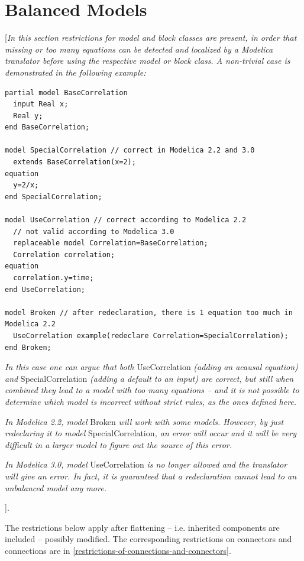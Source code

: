 \documentclass[10pt,a4paper]{report}
\def\doublelabel#1{\label{#1}}
\begin{document}
\section{Balanced Models}\doublelabel{balanced-models}

{[}\emph{In this section restrictions for model and block classes are
present, in order that missing or too many equations can be detected and
localized by a Modelica translator before using the respective model or
block class. A non-trivial case is demonstrated in the following
example:}

\begin{lstlisting}[language=modelica]
partial model BaseCorrelation
  input Real x;
  Real y;
end BaseCorrelation;

model SpecialCorrelation // correct in Modelica 2.2 and 3.0
  extends BaseCorrelation(x=2);
equation
  y=2/x;
end SpecialCorrelation;

model UseCorrelation // correct according to Modelica 2.2
  // not valid according to Modelica 3.0
  replaceable model Correlation=BaseCorrelation;
  Correlation correlation;
equation
  correlation.y=time;
end UseCorrelation;

model Broken // after redeclaration, there is 1 equation too much in Modelica 2.2
  UseCorrelation example(redeclare Correlation=SpecialCorrelation);
end Broken;
\end{lstlisting}

\emph{In this case one can argue that both} UseCorrelation \emph{(adding
an acausal equation) and} SpecialCorrelation \emph{(adding a default to
an input) are correct, but still when combined they lead to a model with
too many equations -- and it is not possible to determine which model is
incorrect without strict rules, as the ones defined here.}

\emph{In Modelica 2.2, model} Broken \emph{will work with some models.
However, by just redeclaring it to model} SpecialCorrelation\emph{, an
error will occur and it will be very difficult in a larger model to
figure out the source of this error. }

\emph{In Modelica 3.0, model} UseCorrelation \emph{is no longer allowed
and the translator will give an error. In fact, it is guaranteed that a
redeclaration cannot lead to an unbalanced model any more.}

{]}.

The restrictions below apply after flattening -- i.e. inherited
components are included -- possibly modified. The corresponding
restrictions on connectors and connections are in \ref{restrictions-of-connections-and-connectors}.
\end{document}
